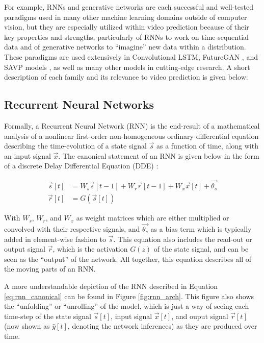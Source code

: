 \documentclass{scrartcl}
\begin{document}
For example, RNNs and generative networks are each successful and well-tested
paradigms used in many other machine learning domains outside of computer
vision, but they are especially utilized within video prediction because of
their key properties and strengths, particularly of RNNs to work on
time-sequential data and of generative networks to ``imagine'' new data within
a distribution. These paradigms are used extensively in Convolutional LSTM,
FutureGAN \cite{futuregan}, and SAVP models \cite{savp}, as well as many other
models in cutting-edge research. A short description of each family and its
relevance to video prediction is given below:

\subsection{Recurrent Neural Networks}
\label{subsec:recurrent}

Formally, a Recurrent Neural Network (RNN) is the end-result of a mathematical
analysis of a nonlinear first-order non-homogeneous ordinary differential
equation describing the time-evolution of a state signal $\vec{s}$ as a
function of time, along with an input signal $\vec{x}$. The canonical statement
of an RNN is given below in the form of a discrete Delay Differential Equation
(DDE) \cite{rnn_and_lstm_fundamentals}:

\begin{equation}
	\begin{split}
		\vec{s} [t] & = W_s \vec{s} [t - 1] + W_r \vec{r} [t - 1] + W_x \vec{x} [t] + \vec{\theta_s} \\
		\vec{r} [t] & = G ( \vec{s} [t] )
	\end{split}
	\label{eq:rnn_canonical}
\end{equation}

With $W_s$, $W_r$, and $W_x$ as weight matrices which are either multiplied or
convolved with their respective signals, and $\vec{\theta_s}$ as a bias term
which is typically added in element-wise fashion to $\vec{s}$. This equation
also includes the read-out or output signal $\vec{r}$, which is the activation
$G(z)$ of the state signal, and can be seen as the ``output'' of the network.
All together, this equation describes all of the moving parts of an RNN.

A more understandable depiction of the RNN described in Equation
\ref{eq:rnn_canonical} can be found in Figure \ref{fig:rnn_arch}. This figure
also shows the ``unfolding'' or ``unrolling'' of the model, which is just a way
of seeing each time-step of the state signal $\vec{s} [t]$, input signal
$\vec{x} [t]$, and ouput signal $\vec{r} [t]$ (now shown as $\hat{y} [t]$,
denoting the network inferences) as they are produced over time.
\end{document}
